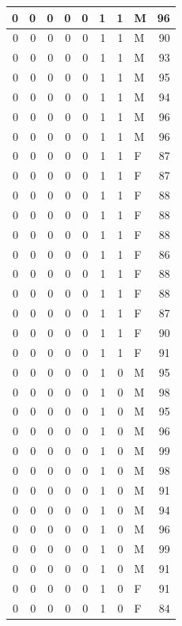 \documentclass[
  12pt,
]{krantz}
\begin{document}
\begin{tabular}{r|r|r|r|r|r|r|l|r}
\hline
0 & 0 & 0 & 0 & 0 & 1 & 1 & M & 96\\
\hline
0 & 0 & 0 & 0 & 0 & 1 & 1 & M & 90\\
\hline
0 & 0 & 0 & 0 & 0 & 1 & 1 & M & 93\\
\hline
0 & 0 & 0 & 0 & 0 & 1 & 1 & M & 95\\
\hline
0 & 0 & 0 & 0 & 0 & 1 & 1 & M & 94\\
\hline
0 & 0 & 0 & 0 & 0 & 1 & 1 & M & 96\\
\hline
0 & 0 & 0 & 0 & 0 & 1 & 1 & M & 96\\
\hline
0 & 0 & 0 & 0 & 0 & 1 & 1 & F & 87\\
\hline
0 & 0 & 0 & 0 & 0 & 1 & 1 & F & 87\\
\hline
0 & 0 & 0 & 0 & 0 & 1 & 1 & F & 88\\
\hline
0 & 0 & 0 & 0 & 0 & 1 & 1 & F & 88\\
\hline
0 & 0 & 0 & 0 & 0 & 1 & 1 & F & 88\\
\hline
0 & 0 & 0 & 0 & 0 & 1 & 1 & F & 86\\
\hline
0 & 0 & 0 & 0 & 0 & 1 & 1 & F & 88\\
\hline
0 & 0 & 0 & 0 & 0 & 1 & 1 & F & 88\\
\hline
0 & 0 & 0 & 0 & 0 & 1 & 1 & F & 87\\
\hline
0 & 0 & 0 & 0 & 0 & 1 & 1 & F & 90\\
\hline
0 & 0 & 0 & 0 & 0 & 1 & 1 & F & 91\\
\hline
0 & 0 & 0 & 0 & 0 & 1 & 0 & M & 95\\
\hline
0 & 0 & 0 & 0 & 0 & 1 & 0 & M & 98\\
\hline
0 & 0 & 0 & 0 & 0 & 1 & 0 & M & 95\\
\hline
0 & 0 & 0 & 0 & 0 & 1 & 0 & M & 96\\
\hline
0 & 0 & 0 & 0 & 0 & 1 & 0 & M & 99\\
\hline
0 & 0 & 0 & 0 & 0 & 1 & 0 & M & 98\\
\hline
0 & 0 & 0 & 0 & 0 & 1 & 0 & M & 91\\
\hline
0 & 0 & 0 & 0 & 0 & 1 & 0 & M & 94\\
\hline
0 & 0 & 0 & 0 & 0 & 1 & 0 & M & 96\\
\hline
0 & 0 & 0 & 0 & 0 & 1 & 0 & M & 99\\
\hline
0 & 0 & 0 & 0 & 0 & 1 & 0 & M & 91\\
\hline
0 & 0 & 0 & 0 & 0 & 1 & 0 & F & 91\\
\hline
0 & 0 & 0 & 0 & 0 & 1 & 0 & F & 84\\

\end{tabular}
\end{document}
